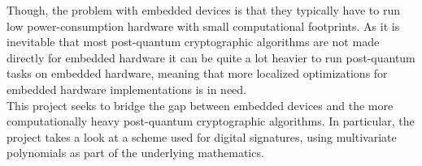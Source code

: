 Though, the problem with embedded devices is that they typically have to run low power-consumption hardware with small computational footprints. As it is inevitable that most post-quantum cryptographic algorithms are not made directly for embedded hardware it can be quite a lot heavier to run post-quantum tasks on embedded hardware, meaning that more localized optimizations for embedded hardware implementations is in need.\medskip\\
This project seeks to bridge the gap between embedded devices and the more computationally heavy post-quantum cryptographic algorithms. In particular, the project takes a look at a scheme used for digital signatures, using multivariate polynomials as part of the underlying mathematics.
\pagebreak